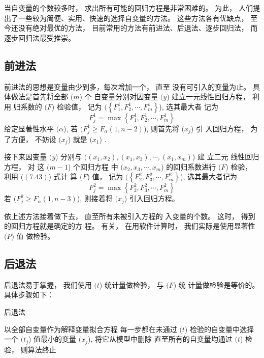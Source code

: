当自变量的个数较多时， 求出所有可能的回归方程是非常困难的。 为此， 人们提出了一些较为简便、实用、快速的选择自变量的方法。 这些方法各有优缺点， 至今还没有绝对最优的方法， 目前常用的方法有前进法、后退法、逐步回归法， 而逐步回归法最受推崇。 

\subsection{前进法}

前进法的思想是变量由少到多，每次增加一个， 直至
没有可引入的变量为止。 具体做法是首先将全部 $( {m} $) 个 自变量分别对因变量 $( {y} $) 建立一元线性回归方程， 利用
归系数的 $( F $) 检验值， 记为 $( \left\{F_{1}^{1}, F_{2}^{1}, \cdots, F_{m}^{1}\right\} $), 选其最大者 记为
\begin{equation}
F_{j}^{1}=\max \left\{F_{1}^{1}, F_{2}^{1}, \cdots, F_{m}^{1}\right\}
\end{equation}
给定显著性水平 $( \alpha $), 若 $( F_{j}^{1} \geq F_{\alpha}(1, n-2) $), 则首先将 $( {x}_{j} $) 引 入回归方程， 为了方便， 不妨设 $( {x}_{j} $) 就是 $( {x}_{1} $) . 

接下来因变量 $( y $) 分别与 $( \left(x_{1}, x_{2}\right),\left(x_{1}, x_{3}\right), \cdots,\left(x_{1}, x_{m}\right) $) 建
立二元 线性回归方程， 对 这 $( {m}-{1} $) 个回归方程 中 $( x_{2}, x_{3}, \cdots, x_{m} $) 的回归系数进行 $( F $) 检验， 利用 $( (7.43) $) 式计 算 $( {F} $) 值， 记为 $( \left\{{F}_{2}^{2}, {F}_{3}^{2}, \cdots, {F}_{m}^{2}\right\} $), 选其最大者记为
\begin{equation}
F_{j}^{2}=\max \left\{F_{2}^{2}, F_{3}^{2}, \cdots, F_{m}^{2}\right\}
\end{equation}
若 $( {F}_{j}^{2} \geq {F}_{\alpha} {( 1 , n - 3 )} $), 则接着将 $( {x}_{{j}} $) 引入回归方程。 

依上述方法接着做下去， 直至所有未被引入方程的
入变量的个数。 这时， 得到的回归方程就是确定的方
程。 
有关， 在用软件计算时， 我们实际是使用显著性 $( {P} $) 值
做检验。 

\subsection{后退法}

后退法易于掌握， 我们使用 $( t $) 统计量做检验， 与 $( {F} $) 统
计量做检验是等价的。 具体步骤如下：

\begin{algorithm}
    \caption{后退法}
    以全部自变量作为解释变量拟合方程\;
    每一步都在未通过 $( {t} $) 检验的自变量中选择一个
$( {t}_{j} $) 值最小的变量 $( {x}_{j} $), 将它从模型中删除\;
    直至所有的自变量均通过 $( {t} $) 检验， 则算法终止\;
\end{algorithm}

